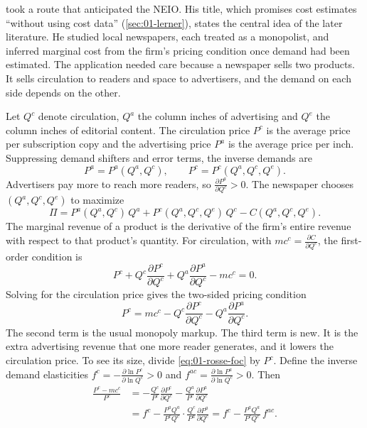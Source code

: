 \citet{Rosse1970} took a route that anticipated the NEIO. His title, which promises cost estimates ``without using cost
data'' (\cref{sec:01-lerner}), states the central idea of the later literature. He studied local newspapers, each treated as a
monopolist, and inferred marginal cost from the firm's pricing condition once demand had been estimated. The
application needed care because a newspaper sells two products. It sells circulation to readers and space to
advertisers, and the demand on each side depends on the other.

Let $Q^c$ denote circulation, $Q^a$ the column inches of advertising and $Q^e$ the column inches of editorial
content. The circulation price $P^c$ is the average price per subscription copy and the advertising price $P^a$ is
the average price per inch. Suppressing demand shifters and error terms, the inverse demands are
\begin{equation}\label{eq:01-rosse-demand}
P^a = P^a(Q^a, Q^c), \qquad P^c = P^c(Q^a, Q^c, Q^e).
\end{equation}
Advertisers pay more to reach more readers, so $\frac{\partial P^a}{\partial Q^c} > 0$. The newspaper chooses
$(Q^a, Q^c, Q^e)$ to maximize
\begin{equation*}
\Pi = P^a(Q^a, Q^c)\,Q^a + P^c(Q^a, Q^c, Q^e)\,Q^c - C(Q^a, Q^c, Q^e).
\end{equation*}
The marginal revenue of a product is the derivative of the firm's entire revenue with respect to that product's
quantity. For circulation, with $mc^c = \frac{\partial C}{\partial Q^c}$, the first-order condition is
\begin{equation*}
P^c + Q^c\frac{\partial P^c}{\partial Q^c} + Q^a\frac{\partial P^a}{\partial Q^c} - mc^c = 0 .
\end{equation*}
Solving for the circulation price gives the two-sided pricing condition \citep[eq.~6c]{Bresnahan1989}
\begin{equation}\label{eq:01-rosse-foc}
P^c = mc^c - Q^c\frac{\partial P^c}{\partial Q^c} - Q^a\frac{\partial P^a}{\partial Q^c} .
\end{equation}
The second term is the usual monopoly markup. The third term is new. It is the extra advertising revenue that one more
reader generates, and it lowers the circulation price. To see its size, divide \eqref{eq:01-rosse-foc} by $P^c$. Define
the inverse demand elasticities $f^c = -\frac{\partial \ln P^c}{\partial \ln Q^c} > 0$ and
$f^{ac} = \frac{\partial \ln P^a}{\partial \ln Q^c} > 0$. Then
\begin{align*}
\frac{P^c - mc^c}{P^c}
  &= -\frac{Q^c}{P^c}\frac{\partial P^c}{\partial Q^c} - \frac{Q^a}{P^c}\frac{\partial P^a}{\partial Q^c} \\
  &= f^c - \frac{P^a Q^a}{P^c Q^c}\cdot\frac{Q^c}{P^a}\frac{\partial P^a}{\partial Q^c}
   = f^c - \frac{P^a Q^a}{P^c Q^c}\, f^{ac} .
\end{align*}
